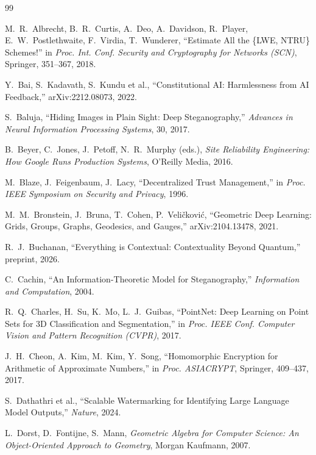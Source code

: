 \begin{thebibliography}{99}

M.~R.~Albrecht, B.~R.~Curtis, A.~Deo, A.~Davidson, R.~Player, E.~W.~Postlethwaite, F.~Virdia, T.~Wunderer, ``Estimate All the \{LWE, NTRU\} Schemes!'' in \textit{Proc. Int. Conf. Security and Cryptography for Networks (SCN)}, Springer, 351--367, 2018.

Y.~Bai, S.~Kadavath, S.~Kundu et al., ``Constitutional AI: Harmlessness from AI Feedback,'' arXiv:2212.08073, 2022.

S.~Baluja, ``Hiding Images in Plain Sight: Deep Steganography,'' \textit{Advances in Neural Information Processing Systems}, 30, 2017.

B.~Beyer, C.~Jones, J.~Petoff, N.~R.~Murphy (eds.), \textit{Site Reliability Engineering: How Google Runs Production Systems}, O'Reilly Media, 2016.

M.~Blaze, J.~Feigenbaum, J.~Lacy, ``Decentralized Trust Management,'' in \textit{Proc. IEEE Symposium on Security and Privacy}, 1996.

M.~M.~Bronstein, J.~Bruna, T.~Cohen, P.~Veličković, ``Geometric Deep Learning: Grids, Groups, Graphs, Geodesics, and Gauges,'' arXiv:2104.13478, 2021.

R.~J.~Buchanan, ``Everything is Contextual: Contextuality Beyond Quantum,'' preprint, 2026.

C.~Cachin, ``An Information-Theoretic Model for Steganography,'' \textit{Information and Computation}, 2004.

R.~Q.~Charles, H.~Su, K.~Mo, L.~J.~Guibas, ``PointNet: Deep Learning on Point Sets for 3D Classification and Segmentation,'' in \textit{Proc. IEEE Conf. Computer Vision and Pattern Recognition (CVPR)}, 2017.

J.~H.~Cheon, A.~Kim, M.~Kim, Y.~Song, ``Homomorphic Encryption for Arithmetic of Approximate Numbers,'' in \textit{Proc. ASIACRYPT}, Springer, 409--437, 2017.

S.~Dathathri et al., ``Scalable Watermarking for Identifying Large Language Model Outputs,'' \textit{Nature}, 2024.

L.~Dorst, D.~Fontijne, S.~Mann, \textit{Geometric Algebra for Computer Science: An Object-Oriented Approach to Geometry}, Morgan Kaufmann, 2007.


\end{thebibliography}
